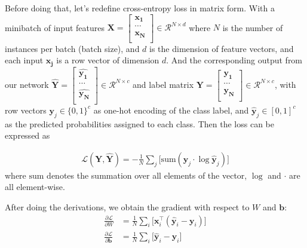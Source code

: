 Before doing that, let's redefine cross-entropy loss in matrix form. With a minibatch of input features $\mathbf{X} = \left[\begin{array}{c}
        \mathbf{x_1}\\
        \cdots\\
        \mathbf{x_N}\\
    \end{array}\right] \in \mathcal{R}^{N \times d} $ where $N$ is the number of instances per batch (batch size), and $d$ is the dimension of feature vectors, and each input $\mathbf{x_j}$ is a row vector of dimension $d$. And the corresponding output from our network $\hat{\mathbf{Y}} = \left[\begin{array}{c}
        \hat{\mathbf{y_1}}\\
        \cdots\\
        \hat{\mathbf{y_N}}\\
    \end{array}\right] \in \mathcal{R}^{N \times c}$ and label matrix $\mathbf{Y} = \left[\begin{array}{c}
        \mathbf{y_1}\\
        \cdots\\
        \mathbf{y_N}\\
    \end{array}\right] \in \mathcal{R}^{N \times c} $, with row vectors $\mathbf{y}_j \in \{0, 1\}^{c}$ as one-hot encoding of the class label, and $\hat{\mathbf{y}}_j \in [0, 1]^{c}$ as the predicted probabilities assigned to each class. Then the loss can be expressed as

\begin{align}
    \mathcal{L}(\mathbf{Y}, \hat{\mathbf{Y}}) =   - \frac{1}{N} \sum_{j} \big[ \textrm{sum}(\mathbf{y}_j  \cdot \log \hat{\mathbf{y}}_j) \big] \label{eq:ce}
\end{align}
where $\textrm{sum}$ denotes the summation over all elements of the vector, $\log$ and $\cdot$ are all element-wise.


After doing the derivations, we obtain the gradient with respect to $W$ and $\mathbf{b}$:
\begin{align}
     \frac{\partial \mathcal{L} }{\partial W} &= \frac{1}{N} \sum_{i} \big[ \mathbf{x}_i^\top (\hat{\mathbf{y}}_i - \mathbf{y}_i) \big]\\
     \frac{\partial \mathcal{L} }{\partial \mathbf{b}} &= \frac{1}{N} \sum_{i} \big[ \hat{\mathbf{y}}_i - \mathbf{y}_i \big]
\end{align}

